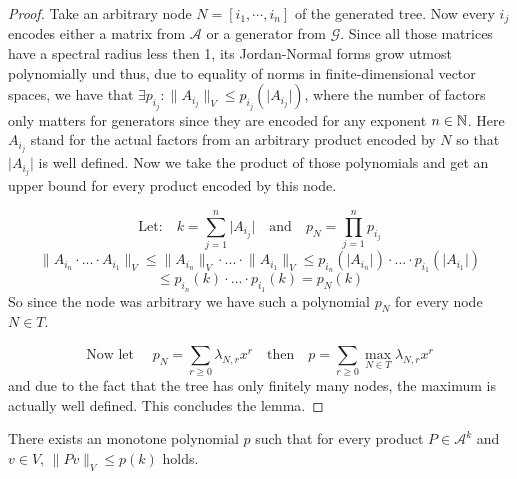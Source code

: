 \begin{proof}
  Take an arbitrary node $N = [i_1, \cdots, i_n]$ of the generated tree. 
  Now every $i_j$ encodes either a matrix from $\mathcal{A}$ or a generator from $\mathcal{G}$. 
  Since all those matrices have a spectral radius less then 1, its Jordan-Normal forms grow utmost polynomially und thus, due to equality of norms in finite-dimensional vector spaces, we have that $ \exists p_{i_j}: \lVert A_{i_j} \rVert _V \le p_{i_j}(\lvert A_{i_j} \rvert)$, where the number of factors only matters for generators since they are encoded for any exponent $n \in \mathbb{N}$.
  Here $ A_{i_j} $ stand for the actual factors from an arbitrary product encoded by $N$ so that $\lvert A_{i_j} \rvert$ is well defined. 
  Now we take the product of those polynomials and get an upper bound for every product encoded by this node. 

  $$ 
    \text{Let:} \quad k = \sum \limits_{j = 1}^{n} \lvert A_{i_j} \rvert \quad \text{and} \quad p_{N} = \prod \limits_{j = 1}^{n} p_{i_j}
  $$
  $$ 
    \lVert A_{i_n} \cdot ... \cdot A_{i_1} \rVert _V \le \lVert A_{i_n} \rVert _V \cdot ... \cdot \lVert A_{i_1} \rVert _V \le p_{i_n}(\lvert A_{i_n} \rvert) \cdot ... \cdot p_{i_1}(\lvert A_{i_1} \rvert)
  $$
  $$
    \le p_{i_n}(k) \cdot ... \cdot p_{i_1}(k) = p_{N}(k)
  $$
  So since the node was arbitrary we have such a polynomial $p_N$ for every node $N \in T$. 
  
  $$
    \text{Now let } \quad p_N = \sum \limits_{r \geq 0} \lambda_{N,r} x^r \quad \text{then} \quad p = \sum \limits_{r \geq 0} \max \limits_{N \in T}\lambda_{N,r}x^r
  $$
  and due to the fact that the tree has only finitely many nodes, the maximum is actually well defined. This concludes the lemma.
  
\end{proof}

\begin{lemma}
  \label{lem:arb.prod.bound}
  There exists an monotone polynomial $p$ such that for every product $P \in \mathcal{A}^k$ and $v \in V$, $\lVert Pv \rVert _V \le p(k)$ holds.
\end{lemma}

